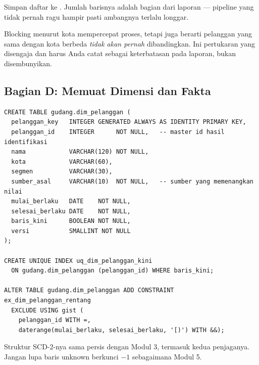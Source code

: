 Simpan daftar  ke . Jumlah barisnya
adalah bagian dari laporan --- pipeline yang tidak pernah ragu hampir pasti
ambangnya terlalu longgar.

\begin{peringatan}
Blocking menurut kota mempercepat proses, tetapi juga berarti pelanggan yang
sama dengan kota berbeda \emph{tidak akan pernah} dibandingkan. Ini pertukaran
yang disengaja dan harus Anda catat sebagai keterbatasan pada laporan, bukan
disembunyikan.
\end{peringatan}

\subsection{Bagian D: Memuat Dimensi dan Fakta}


\begin{lstlisting}[style=sqlgaya]
CREATE TABLE gudang.dim_pelanggan (
  pelanggan_key   INTEGER GENERATED ALWAYS AS IDENTITY PRIMARY KEY,
  pelanggan_id    INTEGER      NOT NULL,   -- master id hasil identifikasi
  nama            VARCHAR(120) NOT NULL,
  kota            VARCHAR(60),
  segmen          VARCHAR(30),
  sumber_asal     VARCHAR(10)  NOT NULL,   -- sumber yang memenangkan nilai
  mulai_berlaku   DATE    NOT NULL,
  selesai_berlaku DATE    NOT NULL,
  baris_kini      BOOLEAN NOT NULL,
  versi           SMALLINT NOT NULL
);

CREATE UNIQUE INDEX uq_dim_pelanggan_kini
  ON gudang.dim_pelanggan (pelanggan_id) WHERE baris_kini;

ALTER TABLE gudang.dim_pelanggan ADD CONSTRAINT ex_dim_pelanggan_rentang
  EXCLUDE USING gist (
    pelanggan_id WITH =,
    daterange(mulai_berlaku, selesai_berlaku, '[)') WITH &&);
\end{lstlisting}

Struktur SCD-2-nya sama persis dengan  Modul 3, termasuk
kedua penjaganya. Jangan lupa baris unknown berkunci $-1$ sebagaimana Modul 5.


